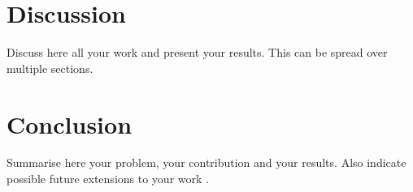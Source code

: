 \documentclass[a4paper,12pt]{article}
\begin{document}
\section{Discussion}
Discuss here all your work and present your results. This can be spread over multiple sections.

\section{Conclusion}
Summarise here your problem, your contribution and your results. Also indicate possible future extensions to your work \cite{09OLI00}.


\end{document}
